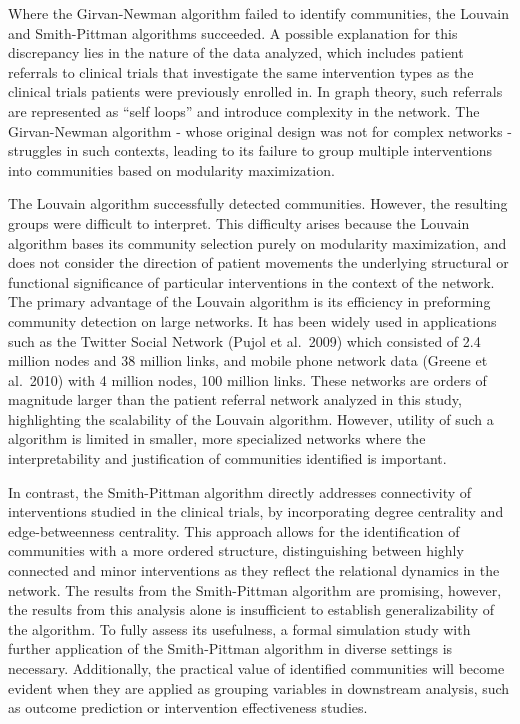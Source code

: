 \documentclass{article}
\begin{document}
Where the Girvan-Newman algorithm failed to identify communities, the
Louvain and Smith-Pittman algorithms succeeded. A possible explanation
for this discrepancy lies in the nature of the data analyzed, which
includes patient referrals to clinical trials that investigate the same
intervention types as the clinical trials patients were previously
enrolled in. In graph theory, such referrals are represented as
``self loops'' and introduce complexity in the network. The
Girvan-Newman algorithm - whose original design was not for complex
networks - struggles in such contexts, leading to its failure to group
multiple interventions into communities based on modularity
maximization.

The Louvain algorithm successfully detected communities. However, the
resulting groups were difficult to interpret. This difficulty arises
because the Louvain algorithm bases its community selection purely on
modularity maximization, and does not consider the direction of patient
movements the underlying structural or functional significance of
particular interventions in the context of the network. The primary
advantage of the Louvain algorithm is its efficiency in preforming
community detection on large networks. It has been widely used in
applications such as the Twitter Social Network (Pujol et al.~2009)
which consisted of 2.4 million nodes and 38 million links, and mobile
phone network data (Greene et al.~2010) with 4 million nodes, 100
million links. These networks are orders of magnitude larger than the
patient referral network analyzed in this study, highlighting the
scalability of the Louvain algorithm. However, utility of such a
algorithm is limited in smaller, more specialized networks where the
interpretability and justification of communities identified is
important.

In contrast, the Smith-Pittman algorithm directly addresses connectivity
of interventions studied in the clinical trials, by incorporating degree
centrality and edge-betweenness centrality. This approach allows for the
identification of communities with a more ordered structure,
distinguishing between highly connected and minor interventions as they
reflect the relational dynamics in the network. The results from the
Smith-Pittman algorithm are promising, however, the results from this
analysis alone is insufficient to establish generalizability of the
algorithm. To fully assess its usefulness, a formal simulation study with
further application of the Smith-Pittman algorithm in diverse settings
is necessary. Additionally, the practical value of identified
communities will become evident when they are applied as grouping
variables in downstream analysis, such as outcome prediction or
intervention effectiveness studies.
\end{document}
